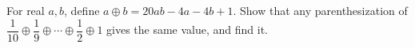 For real $a,b$, define $a\oplus b=20ab-4a-4b+1$. Show that any parenthesization of $\dfrac{1}{10}\oplus\dfrac{1}{9}\oplus\cdots\oplus\dfrac{1}{2}\oplus1$ gives the same value, and find it.
